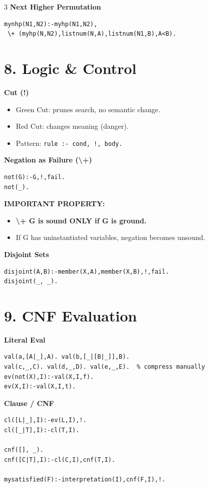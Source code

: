 \documentclass[8pt,landscape]{article}
\begin{document}
\begin{multicols*}{3}
\textbf{Next Higher Permutation}
\begin{lstlisting}
mynhp(N1,N2):-myhp(N1,N2),
 \+ (myhp(N,N2),listnum(N,A),listnum(N1,B),A<B).
\end{lstlisting}

\section*{8. Logic \& Control}

\textbf{Cut (!)}
\begin{itemize}[leftmargin=5pt]
\item Green Cut: prunes search, no semantic change.
\item Red Cut: changes meaning (danger).
\item Pattern: \texttt{rule :- cond, !, body.}
\end{itemize}

\textbf{Negation as Failure (\textbackslash+)}
\begin{lstlisting}
not(G):-G,!,fail.
not(_).
\end{lstlisting}

\textbf{IMPORTANT PROPERTY:}
\begin{itemize}[leftmargin=5pt]
\item \textbf{\textbackslash+ G is sound ONLY if G is ground.}
\item If G has uninstantiated variables, negation becomes unsound.
\end{itemize}

\textbf{Disjoint Sets}
\begin{lstlisting}
disjoint(A,B):-member(X,A),member(X,B),!,fail.
disjoint(_, _).
\end{lstlisting}

\section*{9. CNF Evaluation}

\textbf{Literal Eval}
\begin{lstlisting}
val(a,[A|_],A). val(b,[_|[B|_]],B).
val(c,_,C). val(d,_,D). val(e,_,E).  % compress manually
ev(not(X),I):-val(X,I,f).
ev(X,I):-val(X,I,t).
\end{lstlisting}

\textbf{Clause / CNF}
\begin{lstlisting}
cl([L|_],I):-ev(L,I),!.
cl([_|T],I):-cl(T,I).

cnf([], _).
cnf([C|T],I):-cl(C,I),cnf(T,I).

mysatisfied(F):-interpretation(I),cnf(F,I),!.
\end{lstlisting}

\end{multicols*}
\end{document}
